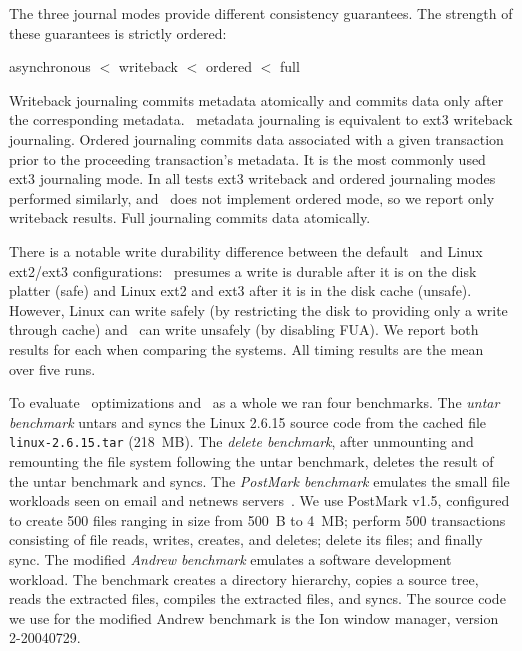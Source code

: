 The three journal modes provide different consistency guarantees.
The strength of these guarantees is strictly ordered:
\vspace{-0.5\baselineskip}
\begin{center}
asynchronous $<$ writeback $<$ ordered $<$ full
\end{center}
\vspace{-0.5\baselineskip}
Writeback journaling commits metadata atomically and commits data only
after the corresponding metadata. \Kudos\ metadata journaling is
equivalent to ext3 writeback journaling.
%
Ordered journaling commits data associated with a given transaction
prior to the proceeding transaction's metadata. It is the most
commonly used ext3 journaling mode.
%
In all tests ext3 writeback and ordered journaling modes performed
similarly, and \Kudos\ does not implement ordered mode, so we report
only writeback results.
%
Full journaling commits data atomically.

There is a notable write durability difference between the default
\Kudos\ and Linux ext2/ext3 configurations: \Kudos\ presumes a write
is durable after it is on the disk platter (safe) and Linux ext2 and
ext3 after it is in the disk cache (unsafe). However, Linux can write
safely (by restricting the disk to providing only a write through
cache) and \Kudos\ can write unsafely (by disabling FUA).
%
We report both results for each when comparing the systems.
%
All timing results are the mean over five runs.

To evaluate \patch\ optimizations and \Kudos\ as a whole we ran four
benchmarks.
%
The \emph{untar benchmark} untars and syncs the Linux 2.6.15 source code
from the cached file \texttt{linux-2.6.15.tar} (218~MB).
%
The \emph{delete benchmark}, after unmounting and remounting the file
system following the untar benchmark, deletes the result of the untar
benchmark and syncs.
%
The \emph{PostMark benchmark} emulates the small file workloads seen
on email and netnews servers~\cite{postmark}. We use PostMark v1.5,
configured to create 500 files ranging in size from 500~B to 4~MB;
perform 500 transactions consisting of file reads, writes, creates,
and deletes; delete its files; and finally sync.
%
The modified \emph{Andrew benchmark} emulates a software development
workload.  The benchmark creates a directory hierarchy, copies a
source tree, reads the extracted files, compiles the extracted files,
and syncs. The source code we use for the modified Andrew benchmark is
the Ion window manager, version 2-20040729.

